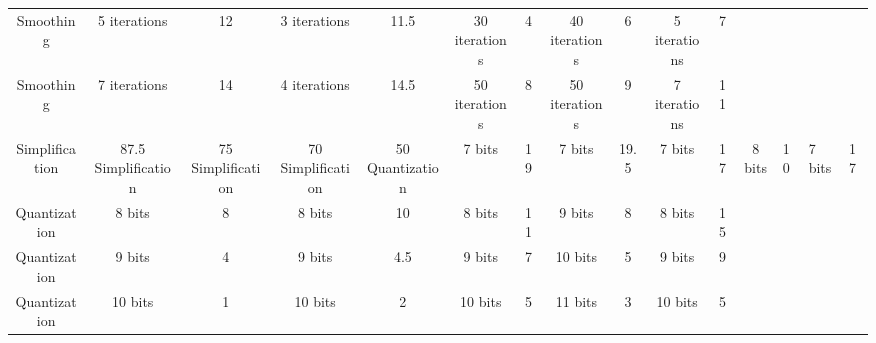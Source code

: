 \begin{table}
\begin{tabular}{ c c c c c c c c c c c c }
        Smoothing & 5 iterations & 12 & 3 iterations & 11.5 & 30 iterations & 4 & 40 iterations & 6 & 5 iterations & 7 \\ 
        Smoothing & 7 iterations & 14 & 4 iterations & 14.5 & 50 iterations & 8 & 50 iterations & 9 & 7 iterations & 11 \\ 
        Simplification & 87.5%
        Simplification & 75%
        Simplification & 70%
        Simplification & 50%
        Quantization & 7 bits & 19 & 7 bits & 19.5 & 7 bits & 17 & 8 bits & 10 & 7 bits & 17 \\ 
        Quantization & 8 bits & 8 & 8 bits & 10 & 8 bits & 11 & 9 bits & 8 & 8 bits & 15 \\ 
        Quantization & 9 bits & 4 & 9 bits & 4.5 & 9 bits & 7 & 10 bits & 5 & 9 bits & 9 \\ 
        Quantization & 10 bits & 1 & 10 bits & 2 & 10 bits & 5 & 11 bits & 3 & 10 bits & 5 \\ 
    \end{tabular} 
\end{table}

